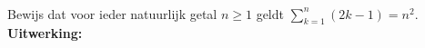 \begin{answer}\mbox{}\\
Bewijs dat voor ieder natuurlijk getal $n\geq 1$ geldt $\sum\limits^n_{k=1}(2k-1)=n^2$.\\[2.5pt]

\noindent\textbf{Uitwerking:}
\end{answer}


%
%
